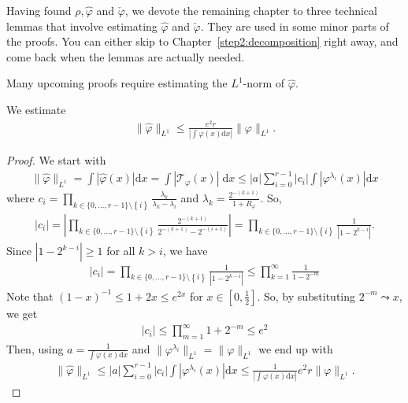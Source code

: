 Having found \( \rho, \hat \varphi \) and \( \check \varphi \), we devote the remaining chapter to three technical lemmas that involve estimating \(\hat \varphi\) and \(\check \varphi\). They are used in some minor parts of the proofs. You can either skip to Chapter~\ref{step2:decomposition} right away, and come back when the lemmas are actually needed.

Many upcoming proofs require estimating the \(L^1\)-norm of \(\hat \varphi\).
\begin{lemma}\label{lemma:tweaked-l1-norm}
We estimate
\begin{align}\label{tweaked-l1-norm}
    \lVert \hat \varphi \rVert_{L^1} \leq \frac{e^2 r}{|\int \varphi(x) \mathrm{d}x |} \lVert \varphi \rVert_{L^1}.
\end{align}
\end{lemma}

\begin{proof}
    We start with 
    \begin{align*}
        \lVert \hat \varphi \rVert_{L^1} = \int |\hat \varphi(x)| \mathrm{d}x = \int |\mathcal{T}_{\varphi}(x)| \; \mathrm{d}x \leq |a| \sum^{r-1}_{i=0} |c_i| \int |\varphi^{\lambda_i}(x)| \mathrm{d}x
    \end{align*}
    where \(c_i = \prod_{k \in \{0,\ldots,r-1\} \setminus\left\{ i \right\} } \frac{\lambda_k}{\lambda_k - \lambda_i}\) and \(\lambda_k = \frac{2^{-(k+1)}}{1+R_\varphi}\). So, 
    \begin{align*}
        |c_i| = \left|\prod_{k \in \{0,\ldots,r-1\} \setminus\left\{ i \right\} } \frac{2^{-(k+1)}}{2^{-(k+1)} - 2^{-(i+1)}}\right| = \prod_{k \in \{0,\ldots,r-1\} \setminus\left\{ i \right\} } \frac{1}{|1 - 2^{k - i}|}.
    \end{align*} 
    Since \(|1 - 2^{k - i}| \geq 1\) for all \(k > i\), we have   
    \begin{align*}
        |c_i| = \prod_{k \in \{0,\ldots,r-1\} \setminus\left\{ i \right\} } \frac{1}{|1 - 2^{k - i}|} \leq \prod^\infty_{k=1} \frac{1}{1 - 2^{-m}}
    \end{align*}
    Note that \((1-x)^{-1} \leq 1 + 2x \leq e^{2x}\) for \(x \in [0,\frac{1}{2}]\). So, by substituting \(2^{-m} \leadsto x\), we get 
    \begin{align}\label{jsknfjkewfwhiru}
        |c_i| \leq \prod^\infty_{m=1} 1 + 2^{-m} \leq e^2
    \end{align}
    Then, using \(a = \frac{1}{\int \varphi(x)\mathrm{d}x}\) and \( \lVert \varphi^{\lambda_i} \rVert_{L^1} =  \lVert \varphi \rVert_{L^1} \)  we end up with 
    \begin{align*}
        \lVert \hat \varphi \rVert_{L^1} \leq |a| \sum^{r-1}_{i=0} |c_i| \int |\varphi^{\lambda_i}(x)| \mathrm{d}x \leq \frac{1}{|\int \varphi(x) \mathrm{d}x|} e^2r \lVert \varphi \rVert_{L^1}.
    \end{align*}
\end{proof}

